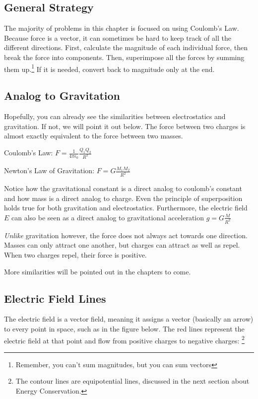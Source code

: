 \hfuzz=100pt 

\subsection{General Strategy}
The majority of problems in this chapter is focused on using Coulomb's Law. Because force is a vector, it can sometimes be hard to keep track of all the different directions. First, calculate the magnitude of each individual force, then break the force into components. Then, superimpose all the forces by summing them up.\footnote{Remember, you can't sum magnitudes, but you can sum vectors} If it is needed, convert back to magnitude only at the end.

\subsection{Analog to Gravitation}
Hopefully, you can already see the similarities between electrostatics and gravitation. If not, we will point it out below. The force between two charges is almost exactly equivalent to the force between two masses.

Coulomb's Law: $F=\frac{1}{4\pi\epsilon_0}\frac{Q_1Q_2}{R^2}$

Newton's Law of Gravitation: $F=G\frac{M_1M_2}{R^2}$

Notice how the gravitational constant is a direct analog to coulomb's constant and how mass is a direct analog to charge. Even the principle of superposition holds true for both gravitation and electrostatics. Furthermore, the electric field $E$ can also be seen as a direct analog to gravitational acceleration $g=G\frac{M}{R^2}$

\emph{Unlike} gravitation however, the force does not always act towards one direction. Masses can only attract one another, but charges can attract as well as repel. When two charges repel, their force is positive.

More similarities will be pointed out in the chapters to come.

\subsection{Electric Field Lines}
The electric field is a vector field, meaning it assigns a vector (basically an arrow) to every point in space, such as in the figure below. The red lines represent the electric field at that point and flow from positive charges to negative charges: \footnote{The contour lines are equipotential lines, discussed in the next section about Energy Conservation.}

